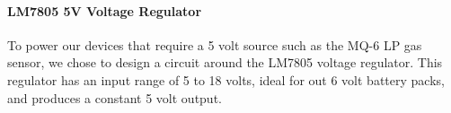 	\paragraph{\normalsize LM7805 5V Voltage Regulator}
	To power our devices that require a 5 volt source such as the MQ-6 LP gas sensor, we chose to design a circuit around the LM7805 voltage regulator. This regulator has an input range of 5 to 18 volts, ideal for out 6 volt battery packs, and produces a constant 5 volt output. 


